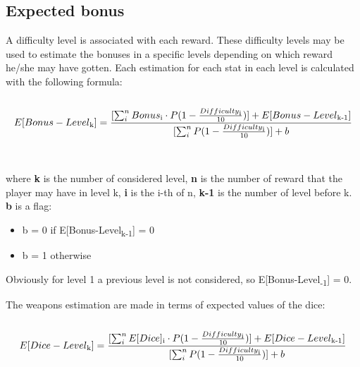 \subsection{Expected bonus}
A difficulty level is associated with each reward. These difficulty levels may be used to estimate the bonuses in a specific levels depending on which reward he/she may have gotten. Each estimation for each stat in each level is calculated with the following formula: \\\\
\begin{equation}
  E[Bonus-Level\textsubscript{k}]= \frac{[\sum_{i}^{n} Bonus\textsubscript{i}
  \cdot
  P(1-\frac{Difficulty\textsubscript{i}}{10})]+E[Bonus-Level\textsubscript{k-1}]}
  {[\sum_{i}^{n}P(1-\frac{Difficulty\textsubscript{i}}{10})]+b}
\end{equation}
\\\\
where \textbf{k} is the number of considered level, \textbf{n} is the number of reward that the player may have in level k, \textbf{i} is the i-th of n, \textbf{k-1} is the number of level before k.\\
\textbf{b} is a flag:
\begin{itemize}
  \item b = 0 if E[Bonus-Level\textsubscript{k-1}] = 0
  \item b = 1 otherwise
\end{itemize}
Obviously for level 1 a previous level is not considered, so E[Bonus-Level\textsubscript{-1}] = 0.

The weapons estimation are made in terms of expected values of the dice:\\\\
\begin{equation}
  E[Dice-Level\textsubscript{k}]= \frac{[\sum_{i}^{n} E[Dice]\textsubscript{i}
  \cdot
  P(1-\frac{Difficulty\textsubscript{i}}{10})]+E[Dice-Level\textsubscript{k-1}]}
  {[\sum_{i}^{n}P(1-\frac{Difficulty\textsubscript{i}}{10})]+b}
\end{equation}


